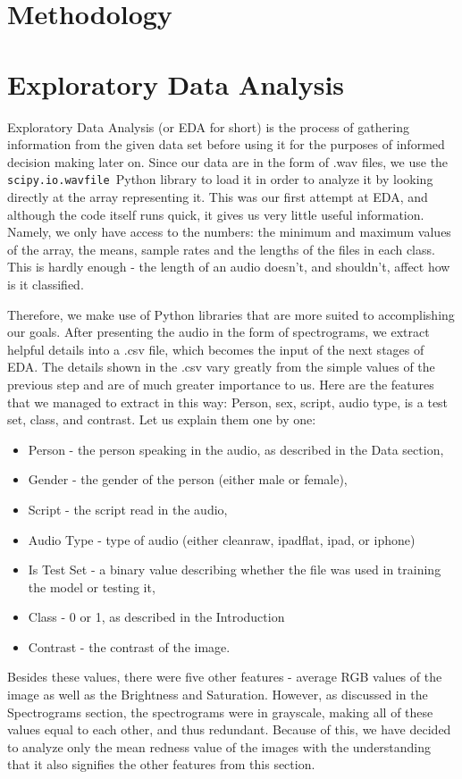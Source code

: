 \documentclass[11pt, letterpaper]{article}
\begin{document}
\section{Methodology}

\section{Exploratory Data Analysis}

Exploratory Data Analysis (or EDA for short) is the process of gathering information from the given data set before using it for the purposes of informed decision making later on. Since our data are in the form of .wav files, we use the \verb | scipy.io.wavfile |Python library to load it in order to analyze it by looking directly at the array representing it. This was our first attempt at EDA, and although the code itself runs quick, it gives us very little useful information. Namely, we only have access to the numbers: the minimum and maximum values of the array, the means, sample rates and the lengths of the files in each class. This is hardly enough - the length of an audio doesn't, and shouldn't, affect how is it classified.

Therefore, we make use of Python libraries that are more suited to accomplishing our goals. After presenting the audio in the form of spectrograms, we extract helpful details into a .csv file, which becomes the input of the next stages of EDA. The details shown in the .csv vary greatly from the simple values of the previous step and are of much greater importance to us. Here are the features that we managed to extract in this way: Person, sex, script, audio type, is a test set, class, and contrast. Let us explain them one by one:
\begin{itemize}
    \item Person - the person speaking in the audio, as described in the Data section,
    \item Gender - the gender of the person (either male or female),
    \item Script - the script read in the audio,
    \item Audio Type - type of audio (either cleanraw, ipadflat, ipad, or iphone)
    \item Is Test Set - a binary value describing whether the file was used in training the model or testing it,
    \item Class - 0 or 1, as described in the Introduction
    \item Contrast - the contrast of the image.
\end{itemize}
Besides these values, there were five other features - average RGB values of the image as well as the Brightness and Saturation. However, as discussed in the Spectrograms section, the spectrograms were in grayscale, making all of these values equal to each other, and thus redundant. Because of this, we have decided to analyze only the mean redness value of the images with the understanding that it also signifies the other features from this section.
\end{document}
